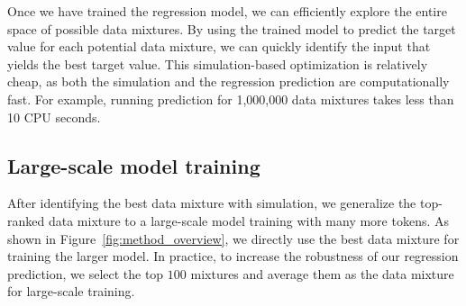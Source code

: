 Once we have trained the regression model, we can efficiently explore the entire space of possible data mixtures.
By using the trained model to predict the target value for each potential data mixture, we can quickly identify the input that yields the best target value. This simulation-based optimization is relatively cheap, as both the simulation and the regression prediction are computationally fast. For example, running prediction for 1,000,000 data mixtures takes less than 10 CPU seconds.

\subsection{Large-scale model training}

After identifying the best data mixture with simulation, we generalize the top-ranked data mixture to a large-scale model training with many more tokens.  As shown in Figure~\ref{fig:method_overview}, we directly use the best data mixture for training the larger model. In practice, to increase the robustness of our regression prediction, we select the top $100$ mixtures and average them as the data mixture for large-scale training. 
